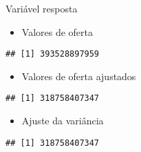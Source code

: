 \documentclass[9pt,ignorenonframetext,aspectratio=169]{beamer}
\newenvironment{Shaded}{\begin{snugshade}}{\end{snugshade}}
\newcommand{\DataTypeTok}[1]{\textcolor[rgb]{0.13,0.29,0.53}{#1}}
\newcommand{\DecValTok}[1]{\textcolor[rgb]{0.00,0.00,0.81}{#1}}
\newcommand{\FloatTok}[1]{\textcolor[rgb]{0.00,0.00,0.81}{#1}}
\newcommand{\KeywordTok}[1]{\textcolor[rgb]{0.13,0.29,0.53}{\textbf{#1}}}
\newcommand{\NormalTok}[1]{#1}
\newcommand{\OperatorTok}[1]{\textcolor[rgb]{0.81,0.36,0.00}{\textbf{#1}}}
\newcommand{\OtherTok}[1]{\textcolor[rgb]{0.56,0.35,0.01}{#1}}
\providecommand{\tightlist}{%
  \setlength{\itemsep}{0pt}\setlength{\parskip}{0pt}}
\begin{document}
\begin{frame}[fragile]{Variável resposta}
\protect\hypertarget{variuxe1vel-resposta}{}

\begin{itemize}
\tightlist
\item
  Valores de oferta
\end{itemize}

\begin{Shaded}
\end{Shaded}

\begin{verbatim}
## [1] 393528897959
\end{verbatim}

\begin{itemize}
\tightlist
\item
  Valores de oferta ajustados
\end{itemize}

\begin{Shaded}
\end{Shaded}

\begin{verbatim}
## [1] 318758407347
\end{verbatim}

\begin{itemize}
\tightlist
\item
  Ajuste da variância
\end{itemize}

\begin{Shaded}
\end{Shaded}

\begin{verbatim}
## [1] 318758407347
\end{verbatim}

\end{frame}
\end{document}
